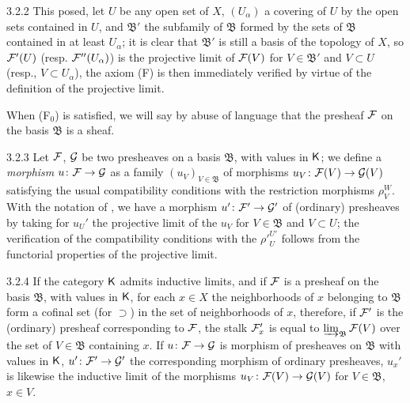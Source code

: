 \documentclass[../main.tex]{subfiles}
\begin{document}
\begin{env}{3.2.2}
This posed, let $U$ be any open set of $X$, $(U_\alpha)$ a covering of $U$ by
the open sets contained in $U$, and $\mathfrak{B}'$ the subfamily of $\mathfrak{B}$ formed by the sets
of $\mathfrak{B}$ contained in at least $U_\alpha$; it is clear that $\mathfrak{B}'$ is still a basis
of the topology of $X$, so $\mathcal{F}'(U)$ (resp. $\mathcal{F}''(U_\alpha)$) is the projective limit of $\mathcal{F}(V)$ for $V\in\mathfrak{B}'$
and $V\subset U$ (resp., $V\subset U_\alpha$), the axiom (F) is then immediately verified by virtue of the definition of the
projective limit.

When (F$_0$) is satisfied, we will say by abuse of language that the presheaf $\mathcal{F}$ on the basis $\mathfrak{B}$ is a sheaf.
\end{env}

\begin{env}{3.2.3}
Let $\mathcal{F}$, $\mathcal{G}$ be two presheaves on a basis $\mathfrak{B}$, with values in $\mathsf{K}$; we define a \emph{morphism}
$u\colon\mathcal{F}\to\mathcal{G}$ as a family $(u_V)_{V\in\mathfrak{B}}$ of morphisms $u_V\colon\mathcal{F}(V)\to\mathcal{G}(V)$ satisfying the usual
compatibility conditions with the restriction morphisms $\rho_V^W$. With the notation of ,
we have a morphism $u'\colon\mathcal{F}'\to\mathcal{G}'$ of (ordinary) presheaves by taking for $u_U'$ the projective limit
of the $u_V$ for $V\in\mathfrak{B}$ and $V\subset U$; the verification of the compatibility conditions with
the ${\rho'}_U^{U'}$ follows from the functorial properties of the projective limit.
\end{env}

\begin{env}{3.2.4}
If the category $\mathsf{K}$ admits inductive limits, and if $\mathcal{F}$ is a presheaf on the basis $\mathfrak{B}$, with
values in $\mathsf{K}$, for each $x\in X$ the neighborhoods of $x$ belonging to $\mathfrak{B}$ form a cofinal set
(for $\supset$) in the set of neighborhoods of $x$, therefore, if $\mathcal{F}'$ is the (ordinary) presheaf
corresponding to $\mathcal{F}$, the stalk $\mathcal{F}_x'$ is equal to $\varinjlim_{\mathfrak{B}}\mathcal{F}(V)$ over the set of
$V\in\mathfrak{B}$ containing $x$. If $u\colon\mathcal{F}\to\mathcal{G}$ is morphism of presheaves on $\mathfrak{B}$ with values in
$\mathsf{K}$, $u'\colon\mathcal{F}'\to\mathcal{G}'$ the corresponding morphism of ordinary presheaves, $u_x'$ is likewise the
inductive limit of the morphisms $u_V\colon\mathcal{F}(V)\to\mathcal{G}(V)$ for $V\in\mathfrak{B}$, $x\in V$.
\end{env}
\end{document}

